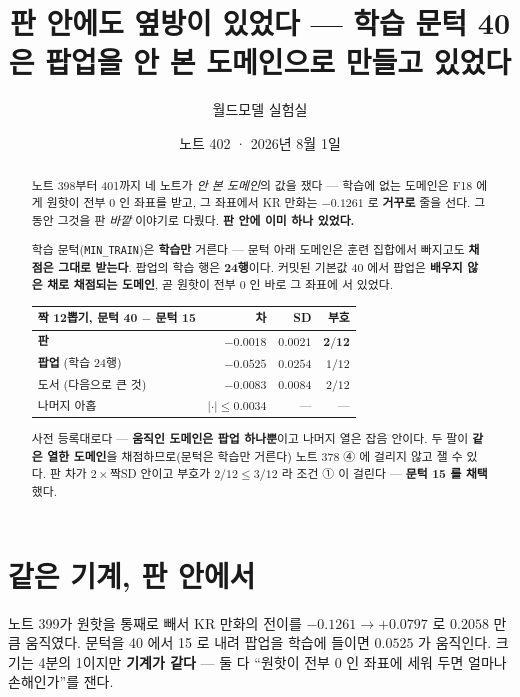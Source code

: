 \documentclass[11pt]{article}
\begin{document}
\title{판 안에도 옆방이 있었다 --- 학습 문턱 40 은 팝업을 안 본 도메인으로 만들고 있었다}
\author{월드모델 실험실}
\date{노트 402 · 2026년 8월 1일}
\maketitle

\begin{abstract}
노트 398부터 401까지 네 노트가 \emph{안 본 도메인}의 값을 쟀다 --- 학습에
없는 도메인은 F18 에게 원핫이 전부 0 인 좌표를 받고, 그 좌표에서 KR 만화는
$-0.1261$ 로 \textbf{거꾸로} 줄을 선다. 그동안 그것을 판 \emph{바깥}
이야기로 다뤘다. \textbf{판 안에 이미 하나 있었다.}

학습 문턱(\texttt{MIN\_TRAIN})은 \textbf{학습만} 거른다 --- 문턱 아래
도메인은 훈련 집합에서 빠지고도 \textbf{채점은 그대로 받는다}. 팝업의 학습
행은 \textbf{24행}이다. 커밋된 기본값 40 에서 팝업은 \textbf{배우지 않은
채로 채점되는 도메인}, 곧 원핫이 전부 0 인 바로 그 좌표에 서 있었다.

\begin{center}
\begin{tabular}{lrrr}
\hline
짝 12뽑기, 문턱 40 $-$ 문턱 15 & 차 & SD & 부호 \\
\hline
\textbf{판} & $\mathbf{-0.0018}$ & $0.0021$ & $\mathbf{2/12}$ \\
\hline
\textbf{팝업} (학습 24행) & $\mathbf{-0.0525}$ & $0.0254$ & $1/12$ \\
도서 (다음으로 큰 것) & $-0.0083$ & $0.0084$ & $2/12$ \\
나머지 아홉 & $|{\cdot}| \le 0.0034$ & --- & --- \\
\hline
\end{tabular}
\end{center}

사전 등록대로다 --- \textbf{움직인 도메인은 팝업 하나뿐}이고 나머지 열은
잡음 안이다. 두 팔이 \textbf{같은 열한 도메인}을 채점하므로(문턱은 학습만
거른다) 노트 378 ④ 에 걸리지 않고 잴 수 있다. 판 차가 $2\times$짝SD 안이고
부호가 $2/12 \le 3/12$ 라 조건 ① 이 걸린다 --- \textbf{문턱 15 를 채택}했다.
\end{abstract}

\section{같은 기계, 판 안에서}

노트 399가 원핫을 통째로 빼서 KR 만화의 전이를 $-0.1261 \to +0.0797$ 로
$0.2058$ 만큼 움직였다. 문턱을 40 에서 15 로 내려 팝업을 학습에 들이면
$0.0525$ 가 움직인다. 크기는 4분의 1이지만 \textbf{기계가 같다} --- 둘 다
``원핫이 전부 0 인 좌표에 세워 두면 얼마나 손해인가''를 잰다.
\end{document}

